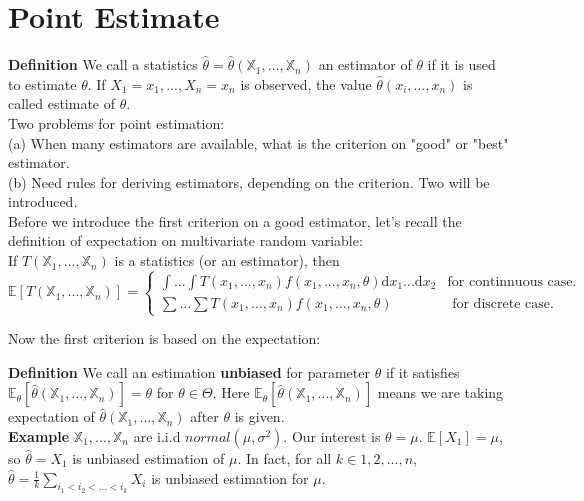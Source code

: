 \section{Point Estimate}

\textbf{Definition} We call a statistics $\hat{\theta} = \hat{\theta} (\mathbb{X}_1, ..., \mathbb{X}_n)$ an estimator of $\theta$ if it is used to estimate $\theta$. If $X_1 = x_1, ...,  X_n = x_n$ is observed, the value $\hat{\theta} (x_i, ..., x_n)$ is called estimate of $\theta$.\\

Two problems for point estimation:\\
(a) When many estimators are available, what is the criterion on "good" or "best" estimator.\\
(b) Need rules for deriving estimators, depending on the criterion. Two will be introduced.\\

Before we introduce the first criterion on a good estimator, let's recall the definition of expectation on multivariate random variable:\\ 

If $T(\mathbb{X}_1, ..., \mathbb{X}_n)$ is a statistics (or an estimator), then
$$
\mathbb{E}[T(\mathbb{X}_1, ..., \mathbb{X}_n)] =
\begin{cases}
\int...\int T(x_1, ..., x_n)f(x_1, ..., x_n, \theta) \mathrm{d}x_1...\mathrm{d}x_2 & \text{for continnuous case.}\\
\sum...\sum T(x_1, ..., x_n)f(x_1, ..., x_n, \theta) & \text{ for discrete case.}
\end{cases}
$$

Now the first criterion is based on the expectation:

\textbf{Definition} We call an estimation \textbf{unbiased} for parameter $\theta$ if it satisfies
$\mathbb{E}_\theta [\hat{\theta}( \mathbb{X}_1, ..., \mathbb{X}_n )] = \theta$ for $\theta \in \Theta$.
Here $\mathbb{E}_\theta [\hat{\theta}( \mathbb{X}_1, ..., \mathbb{X}_n )]$ means we are taking expectation of $\hat{\theta}( \mathbb{X}_1, ..., \mathbb{X}_n )$ after $\theta$ is given.\\


\textbf{Example} $\mathbb{X}_1, ..., \mathbb{X}_n$ are i.i.d $normal( \mu, \sigma^2 )$. Our interest is $\theta = \mu$. $\mathbb{E}[X_1] = \mu$, so $\hat{\theta} = X_1$ is unbiased estimation of $\mu$. In fact, for all $k \in 1, 2, ..., n$, $\hat{\theta} = \frac{1}{k}\sum_{i_1 < i_2 < ...< i_k}X_i$ is unbiased estimation for $\mu$.\\


